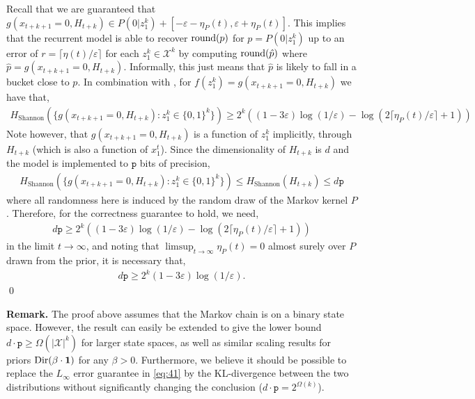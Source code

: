 Recall that we are guaranteed that $g(x_{t+k+1} = 0, H_{t+k}) \in P(0|z_1^k) + [-\varepsilon-\eta_P (t),\varepsilon+\eta_P (t)]$. This implies that the recurrent model is able to recover $\mathrm{round}(p)$ for $p = P(0|z_1^k)$ up to an error of $r=\lceil \eta(t)/\varepsilon \rceil$ for each $z_1^k \in \mathcal{X}^k$ by computing $\mathrm{round} (\hat{p})$ where $\hat{p} = g(x_{t+k+1} = 0, H_{t+k})$. Informally, this just means that $\hat{p}$ is likely to fall in a bucket close to $p$. In combination with , for $f(z_1^k) = g(x_{t+k+1} = 0, H_{t+k})$ we have that,
\begin{align}
    H_{\text{Shannon}} ( \{ g(x_{t+k+1} = 0, H_{t+k}) : z_1^k \in \{0,1\}^k \} ) \ge 2^k \left( (1 - 3 \varepsilon) \log (1/\varepsilon) - \log (2 \lceil \eta_P (t)/\varepsilon \rceil +1)\right)
\end{align}
Note however, that $g(x_{t+k+1} = 0, H_{t+k})$ is a function of $z_1^k$ implicitly, through $H_{t+k}$ (which is also a function of $x_1^t$). Since the dimensionality of $H_{t+k}$ is $d$ and the model is implemented to $\mathtt{p}$ bits of precision,
\begin{align}
    H_{\text{Shannon}} ( \{ g(x_{t+k+1} = 0, H_{t+k}) : z_1^k \in \{0,1\}^k \} )  \le H_{\text{Shannon}} ( H_{t+k} ) \le d \mathtt{p}
\end{align}
where all randomness here is induced by the random draw of the \kth Markov kernel $P$. Therefore, for the correctness guarantee  to hold, we need,
\begin{align}
    d \mathtt{p} \ge 2^k \left( (1 - 3 \varepsilon) \log (1/\varepsilon) - \log (2 \lceil \eta_P (t)/\varepsilon \rceil +1)\right)
\end{align}
in the limit $t \to \infty$, and noting that $\limsup_{t \to \infty} \eta_P (t) = 0$ almost surely over $P$ drawn from the prior, it is necessary that,
\begin{align}
    d \mathtt{p} \ge 2^k (1 - 3 \varepsilon) \log (1/\varepsilon).
\end{align}
\qed

{\bf Remark.} The proof above assumes that the \kth Markov chain is on a binary state space. However, the result can easily be extended to give the lower bound $d \cdot \mathtt{p} \ge \Omega(|\mathcal{X}|^k)$ for larger state spaces, as well as similar scaling results for priors $\mathrm{Dir}(\beta \cdot \bm{1})$ for any $\beta > 0$. Furthermore, we believe it should be possible to replace the $L_\infty$ error guarantee in \cref{eq:41} by the KL-divergence between the two distributions without significantly changing the conclusion ($d \cdot \mathtt{p} = 2^{\Omega(k)}$).

